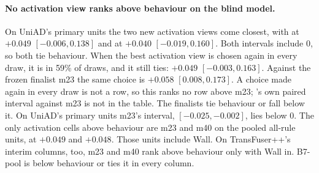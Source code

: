 \paragraph{No activation view ranks above behaviour on the blind model.}
On UniAD's primary units the two new activation views come closest, with
 at $+0.049$ $[-0.006, 0.138]$ and  at $+0.040$
$[-0.019, 0.160]$. Both intervals include 0, so both tie behaviour.
When the best activation view is chosen again in every draw, it is
 in 59\% of draws, and it still ties: $+0.049$ $[-0.003,
0.163]$. Against the frozen finalist m23 the same choice is $+0.058$
$[0.008, 0.173]$. A choice made again in every draw is not a row, so this ranks
no row above m23; 's own paired interval against m23 is not in
the table.
The finalists tie behaviour or fall below it. On UniAD's primary units m23's
interval, $[-0.025, -0.002]$, lies below 0.
The only activation cells above behaviour are m23 and m40 on the pooled
all-rule units, at $+0.049$ and $+0.048$. Those units include Wall. On
TransFuser++'s interim columns, too, m23 and m40 rank above behaviour only with
Wall in. B7-pool is below behaviour or ties it in every
column.

